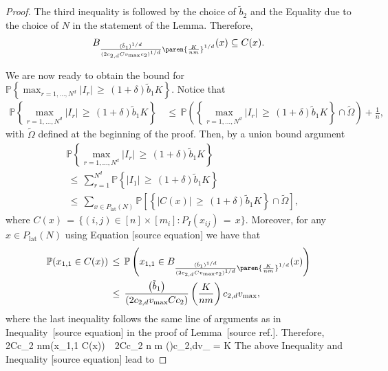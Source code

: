 \documentclass[twoside,11pt]{article}
\makeatletter
\newcommand{\discardlabel}[1]{}
\newcommand{\discardtwo}[2]{}
\newcommand{\legacyref}[1]{\textup{[source ref.]}}
\newcommand{\legacyeqref}[1]{\textup{[source equation]}}
\newenvironment{legacycomparison}{%
  \begingroup\color{legacygray}%
  \let\label\discardlabel
  \let\originallabel\discardlabel
  \let\ref\legacyref
  \let\pageref\legacyref
  \let\eqref\legacyeqref
  \let\cref\legacyref
  \let\Cref\legacyref
  \let\autoref\legacyref
  \let\aliasref\discardtwo
}{\endgroup}
\newcommand{\aliasref}[2]{%
  \@ifundefined{r@#2}{}{%
    \expandafter\let\csname r@#1\expandafter\endcsname\csname r@#2\endcsname}}
\makeatother
\begin{document}
\begin{legacycomparison}
\begin{proof}
The third inequality is followed by the choice of \(\tilde{b}_2\) and the Equality due to the choice of \(N\) in the statement of the Lemma. Therefore,
\begin{align}
B_{\frac{(\tilde b_1)^{1/d}}{(2c_{2,d} Cv_{\text{max}}c_2)^{1/d}}\paren{\frac{K}{nm}}^{1/d}}(x) \subseteq  C(x)
 \label{eq:293}.
\end{align}

We are now ready to obtain the bound for \(\mathbb{P} \left\{ \max_{r=1,\ldots,N^d} |I_r| \,\geq\, (1 + \delta)\tilde b_1 K \right\}\). Notice that
\begin{align}
    \mathbb{P} \left\{ \max_{r=1,\ldots,N^d} |I_r| \,\geq\, (1 + \delta)\tilde b_1 K \right\} &\,\leq\, \mathbb{P} \left(\left\{ \max_{r=1,\ldots,N^d} |I_r| \,\geq\, (1 + \delta)\tilde b_1 K \right\} \cap \tilde \Omega \right)  + \frac{1}{n} \label{eq:294},
\end{align}
with \(\tilde \Omega\) defined at the beginning of the proof. Then, by a union bound argument
\begin{align}
    &\mathbb{P} \left\{ \max_{r=1,\ldots,N^d} |I_r| \,\geq\, (1 + \delta)\tilde b_1 K \right\} \\ 
    &\,\leq\, \sum_{r=1}^{N^d} \mathbb{P} \left\{ |I_1| \,\geq\, (1 + \delta)\tilde b_1 K \right\}
    \\&\,\leq\, \sum_{x \in P_{\text{lat}}(N)} \mathbb{P} \left[\left\{ |C(x)| \,\geq\, (1 + \delta)\tilde b_1 K \right\} \cap \tilde \Omega \right] \label{eq:295__duplicate2},
\end{align}
where \(C(x) \,=\, \{(i,j) \in [n] \times [m_i] : P_I(x_{ij}) \,=\, x\}\). Moreover, for any \(x \in P_{\text{lat}}(N)\) using Equation \eqref{eq:292} we have that
\begin{align}
    \mathbb{P}(x_{1,1} \in C(x)) &\,\leq\, \mathbb{P} \left(x_{1,1} \in B_{\frac{(\tilde b_1)^{1/d}}{(2c_{2,d} Cv_{\text{max}}c_2)^{1/d}}\paren{\frac{K}{nm}}^{1/d}}(x) \right) \nonumber \\
    &\,\leq\, \frac{\left(\tilde{b}_1\right)}{\left(2c_{2,d}v_{\text{max}}Cc_2\right)} \left(\frac{K}{nm}\right)c_{2,d}v_{\text{max}},
\end{align}
where the last inequality follows the same line of arguments as in Inequality~\eqref{eq:272} in the proof of Lemma~\ref{Lemma_13}. Therefore, 
\bea 
2Cc_2 nm(x_{1,1} \in C(x)) \,\leq\, 2Cc_2 n m \left(\right)c_{2,d}v_{}  = K 
\bea 
The above Inequality and Inequality \eqref{eq:295} lead to

\end{proof}
\end{legacycomparison}
\end{document}
